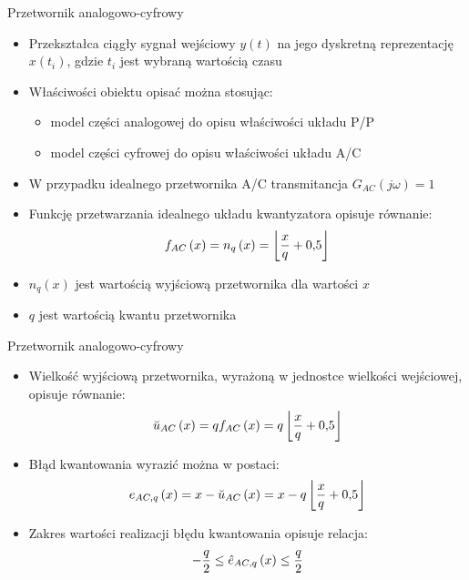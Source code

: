 \documentclass[12pt, polish, aspectratio = 169]{beamer}
\begin{document}
\begin{frame}{Przetwornik analogowo-cyfrowy}
\begin{itemize}
\item Przekształca ciągły sygnał wejściowy $y(t)$ na jego dyskretną reprezentację $x(t_{i})$, gdzie $t_{i}$ jest wybraną wartością czasu
\item Właściwości obiektu opisać można stosując:
	\begin{itemize}
	\item model części analogowej do opisu właściwości układu P/P
	\item model części cyfrowej do opisu właściwości układu A/C
	\end{itemize}
\item W przypadku idealnego przetwornika A/C transmitancja $G_{AC}(j\omega) = 1$
\item Funkcję przetwarzania idealnego układu kwantyzatora opisuje równanie:
\begin{equation}
f_{AC} \left(x\right) = n_{q} \left(x\right) = \left\lfloor \frac{x}{q} + \num{0.5} \right\rfloor \label{eq:adc_function}
\end{equation}
\item $n_{q}(x)$ jest wartością wyjściową przetwornika dla wartości $x$
\item $q$ jest wartością kwantu przetwornika
\end{itemize}
\end{frame}

\begin{frame}{Przetwornik analogowo-cyfrowy}
\begin{itemize}
\item Wielkość wyjściową przetwornika, wyrażoną w jednostce wielkości wejściowej, opisuje równanie:
\begin{equation}
\breve{u}_{AC} \left(x\right) = q f_{AC} \left(x\right) = q \left\lfloor \frac{x}{q} + \num{0.5} \right\rfloor \label{eq:adc_output}
\end{equation}
\item Błąd kwantowania wyrazić można w postaci:
\begin{equation}
e_{AC,q} \left(x\right) = x - \breve{u}_{AC} \left(x\right) = x - q \left\lfloor \frac{x}{q} + \num{0.5} \right\rfloor \label{eq:adc_qerror}
\end{equation}
\item Zakres wartości realizacji błędu kwantowania opisuje relacja:
\begin{equation}
-\frac{q}{2} \le \hat{e}_{AC,q} \left(x\right) \le \frac{q}{2} \label{eq:adc_qerrrange}
\end{equation}
\end{itemize}
\end{frame}
\end{document}

